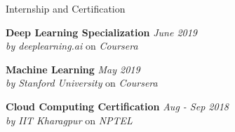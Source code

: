 \documentclass{resume} %
\begin{document}
\begin{rSection}{Internship and Certification}

{\bf \large Deep Learning Specialization}
\hfill \textit{June 2019}
\\ \textit{by deeplearning.ai} on \emph{Coursera}
\par
\vspace{7px}


{\bf \large Machine Learning} 
\hfill \textit{May 2019}
\\ \textit{by Stanford University} on \emph{Coursera}
\par\vspace{7px}


{\bf \large Cloud Computing Certification}
\hfill \textit{Aug - Sep 2018}
\\ \textit{by IIT Kharagpur} on \emph{NPTEL}
\par\vspace{7px}




\end{rSection}
\end{document}
